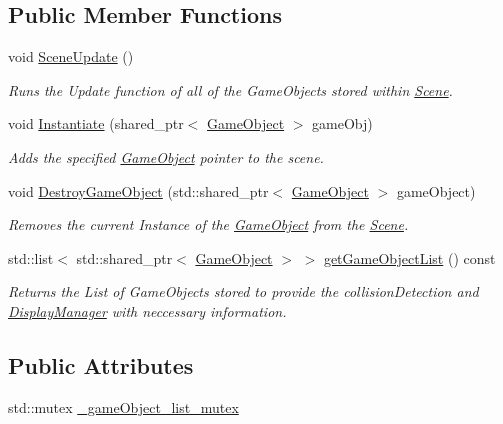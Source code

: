 \subsection*{Public Member Functions}
\begin{DoxyCompactItemize}
\item 
\mbox{\label{class_scene_a1d902efeacc113ceb2dd79a976b04a77}} 
void \hyperlink{class_scene_a1d902efeacc113ceb2dd79a976b04a77}{Scene\+Update} ()
\begin{DoxyCompactList}\small\item\em Runs the Update function of all of the Game\+Objects stored within \hyperlink{class_scene}{Scene}. \end{DoxyCompactList}\item 
void \hyperlink{class_scene_a3dd730cba4a22bf75e54c4b644c26976}{Instantiate} (shared\+\_\+ptr$<$ \hyperlink{class_game_object}{Game\+Object} $>$ game\+Obj)
\begin{DoxyCompactList}\small\item\em Adds the specified \hyperlink{class_game_object}{Game\+Object} pointer to the scene. \end{DoxyCompactList}\item 
void \hyperlink{class_scene_a2e47a6610a3bb6e85373f5b297645754}{Destroy\+Game\+Object} (std\+::shared\+\_\+ptr$<$ \hyperlink{class_game_object}{Game\+Object} $>$ game\+Object)
\begin{DoxyCompactList}\small\item\em Removes the current Instance of the \hyperlink{class_game_object}{Game\+Object} from the \hyperlink{class_scene}{Scene}. \end{DoxyCompactList}\item 
std\+::list$<$ std\+::shared\+\_\+ptr$<$ \hyperlink{class_game_object}{Game\+Object} $>$ $>$ \hyperlink{class_scene_a717b5fcf248038c51b205b022301318f}{get\+Game\+Object\+List} () const
\begin{DoxyCompactList}\small\item\em Returns the List of Game\+Objects stored to provide the collision\+Detection and \hyperlink{class_display_manager}{Display\+Manager} with neccessary information. \end{DoxyCompactList}\end{DoxyCompactItemize}
\subsection*{Public Attributes}
\begin{DoxyCompactItemize}
\item 
std\+::mutex \hyperlink{class_scene_a29183cf37f5227ea9a82d2a15c42336c}{\+\_\+game\+Object\+\_\+list\+\_\+mutex}
\end{DoxyCompactItemize}
